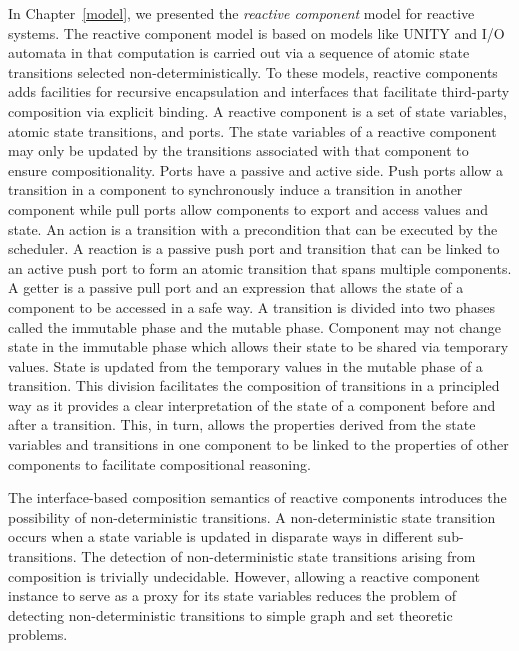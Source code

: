 In Chapter~\ref{model}, we presented the \emph{reactive component} model for reactive systems.
The reactive component model is based on models like UNITY and I/O automata in that computation is carried out via a sequence of atomic state transitions selected non-deterministically.
To these models, reactive components adds facilities for recursive encapsulation and interfaces that facilitate third-party composition via explicit binding.
A reactive component is a set of state variables, atomic state transitions, and ports.
The state variables of a reactive component may only be updated by the transitions associated with that component to ensure compositionality.
Ports have a passive and active side.
Push ports allow a transition in a component to synchronously induce a transition in another component while pull ports allow components to export and access values and state.
An action is a transition with a precondition that can be executed by the scheduler.
A reaction is a passive push port and transition that can be linked to an active push port to form an atomic transition that spans multiple components.
A getter is a passive pull port and an expression that allows the state of a component to be accessed in a safe way.
A transition is divided into two phases called the immutable phase and the mutable phase.
Component may not change state in the immutable phase which allows their state to be shared via temporary values.
State is updated from the temporary values in the mutable phase of a transition.
This division facilitates the composition of transitions in a principled way as it provides a clear interpretation of the state of a component before and after a transition.
This, in turn, allows the properties derived from the state variables and transitions in one component to be linked to the properties of other components to facilitate compositional reasoning.

The interface-based composition semantics of reactive components introduces the possibility of non-deterministic transitions.
A non-deterministic state transition occurs when a state variable is updated in disparate ways in different sub-transitions.
The detection of non-deterministic state transitions arising from composition is trivially undecidable.
However, allowing a reactive component instance to serve as a proxy for its state variables reduces the problem of detecting non-deterministic transitions to simple graph and set theoretic problems.

